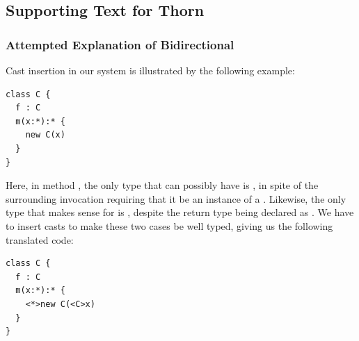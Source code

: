 \documentclass[acmlarge, anonymous, authordraft]{acmart}
\begin{document}

\begin{mathpar}




\end{mathpar}

\subsection{Supporting Text for Thorn}

\subsubsection{Attempted Explanation of Bidirectional}


Cast insertion in our system is illustrated by the following example:

\begin{verbatim}
class C {
  f : C
  m(x:*):* {
    new C(x)
  }
}
\end{verbatim}

Here, in method \m, the only type that \x can possibly have is \any, in spite of the surrounding invocation requiring that it 
be an instance of a \C. Likewise, the only type that makes sense for \New\C\x is \C, despite the return type being declared as
\any. We have to insert casts to make these two cases be well typed, giving us the following translated code:

\begin{verbatim}
class C {
  f : C
  m(x:*):* {
    <*>new C(<C>x)
  }
}
\end{verbatim}
\end{document}
